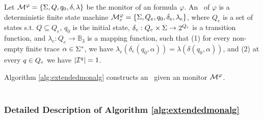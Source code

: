 \begin{definition}
\label{def:Exltl}
Let $\mathcal{M}^\varphi = \{ \Sigma, Q, q_0, \delta , \lambda\}$ be the 
\LTLtri monitor of an \LTL formula $\varphi$. An {\em \Exltl}~of $\varphi$ is a 
deterministic finite state machine $\mathcal{M}^\varphi_e = \{ \Sigma, Q_e, 
q_0, \delta_e , \lambda_e\}$, where $Q_e$ is a set of states s.t. $Q 
\subseteq Q_e$, $q_0$ is the initial state, $\delta_e: Q_e \times \Sigma 
\rightarrow 2^{Q_e}$ is a transition function, and $\lambda_e : Q_e 
\rightarrow \mathbb{B}_3 $ is a mapping function, such that (1) for every 
non-empty finite trace $\alpha \in \Sigma^*$, we have $\lambda_e 
(\delta_e(q_0, \alpha)) = \lambda (\delta(q_0, \alpha))$, and (2) at every 
$q \in Q_e$ we have $|\mathcal{I}^q| = 1$.
\end{definition}

Algorithm \ref{alg:extendedmonalg} constructs an \Exltl~given an \LTLtri monitor 
$\mathcal{M}^\varphi$. \\

 \ \ \ \


\subsubsection{Detailed Description of Algorithm \ref{alg:extendedmonalg}}

